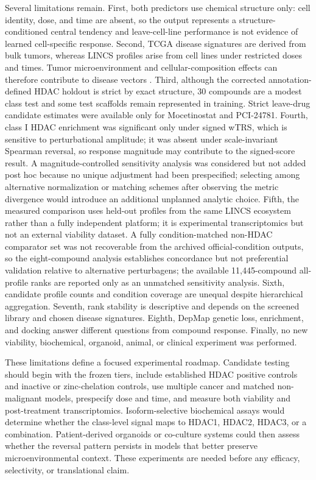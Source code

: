 \begin{roundtworevision}
Several limitations remain. First, both predictors use chemical structure only: cell identity, dose, and time are absent, so the output represents a structure-conditioned central tendency and leave-cell-line performance is not evidence of learned cell-specific response. Second, TCGA disease signatures are derived from bulk tumors, whereas LINCS profiles arise from cell lines under restricted doses and times. Tumor microenvironment and cellular-composition effects can therefore contribute to disease vectors \cite{chouaib2014}. Third, although the corrected annotation-defined HDAC holdout is strict by exact structure, 30 compounds are a modest class test and some test scaffolds remain represented in training. Strict leave-drug candidate estimates were available only for Mocetinostat and PCI-24781. Fourth, class I HDAC enrichment was significant only under signed wTRS, which is sensitive to perturbational amplitude; it was absent under scale-invariant Spearman reversal, so response magnitude may contribute to the signed-score result. A magnitude-controlled sensitivity analysis was considered but not added post hoc because no unique adjustment had been prespecified; selecting among alternative normalization or matching schemes after observing the metric divergence would introduce an additional unplanned analytic choice. Fifth, the measured comparison uses held-out profiles from the same LINCS ecosystem rather than a fully independent platform; it is experimental transcriptomics but not an external viability dataset. A fully condition-matched non-HDAC comparator set was not recoverable from the archived official-condition outputs, so the eight-compound analysis establishes concordance but not preferential validation relative to alternative perturbagens; the available 11,445-compound all-profile ranks are reported only as an unmatched sensitivity analysis. Sixth, candidate profile counts and condition coverage are unequal despite hierarchical aggregation. Seventh, rank stability is descriptive and depends on the screened library and chosen disease signatures. Eighth, DepMap genetic loss, enrichment, and docking answer different questions from compound response. Finally, no new viability, biochemical, organoid, animal, or clinical experiment was performed.
\end{roundtworevision}

\begin{minorrevision}
These limitations define a focused experimental roadmap. Candidate testing should begin with the frozen tiers, include established HDAC positive controls and inactive or zinc-chelation controls, use multiple cancer and matched non-malignant models, prespecify dose and time, and measure both viability and post-treatment transcriptomics. Isoform-selective biochemical assays would determine whether the class-level signal maps to HDAC1, HDAC2, HDAC3, or a combination. Patient-derived organoids or co-culture systems could then assess whether the reversal pattern persists in models that better preserve microenvironmental context. These experiments are needed before any efficacy, selectivity, or translational claim.\par
\end{minorrevision}

